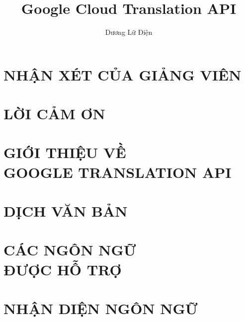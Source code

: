 \documentclass[a4paper,12pt,twoside,openright]{report}	%
\title{Google Cloud Translation API}	%
\author{Dương Lữ Điện}					%
\begin{document}

\chapter*{NHẬN XÉT CỦA GIẢNG VIÊN}


\chapter*{LỜI CẢM ƠN}

\tableofcontents
\listoffigures

\chapter{GIỚI THIỆU VỀ\\GOOGLE TRANSLATION API}

\chapter{DỊCH VĂN BẢN}


\chapter{CÁC NGÔN NGỮ\\ĐƯỢC HỖ TRỢ}


\chapter{NHẬN DIỆN NGÔN NGỮ}

\end{document}

